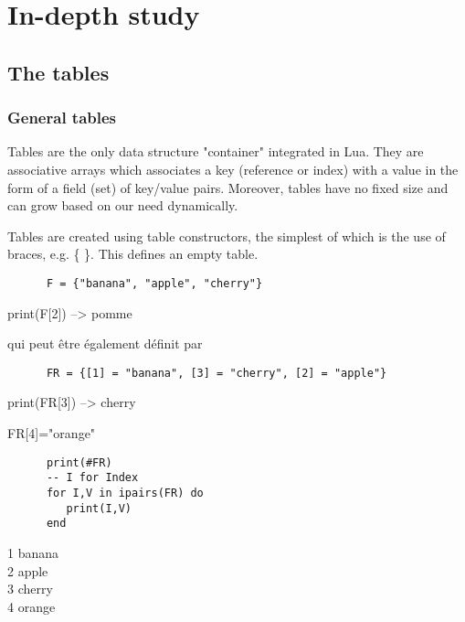 \newpage

\section{In-depth study} %
\label{sec:in_depth_study}

\subsection{The tables} %
\label{sub:the_tables}

\subsubsection{General tables} %
\label{ssub:general_tables}
Tables are the only data structure "container" integrated in Lua.
 They are associative arrays  which associates a key (reference or index) with a value in the form of a field (set) of key/value pairs. Moreover, tables have no fixed size and can grow based on our need dynamically.

Tables are created using table constructors,  the simplest of which is the use of braces, e.g. \{ \}. This defines an empty table.

\begin{mybox}
   \begin{verbatim}
      F = {"banana", "apple", "cherry"}\end{verbatim}
\end{mybox}


print(F[2]) --> pomme


qui peut être également définit par

\begin{mybox}
   \begin{verbatim}
      FR = {[1] = "banana", [3] = "cherry", [2] = "apple"}\end{verbatim}
\end{mybox}


print(FR[3]) --> cherry

FR[4]="orange"

\begin{mybox}
   \begin{verbatim}
      print(#FR)
      -- I for Index
      for I,V in ipairs(FR) do
         print(I,V)
      end \end{verbatim}
\end{mybox}

1 banana\\
2 apple\\
3 cherry\\
4 orange\\

